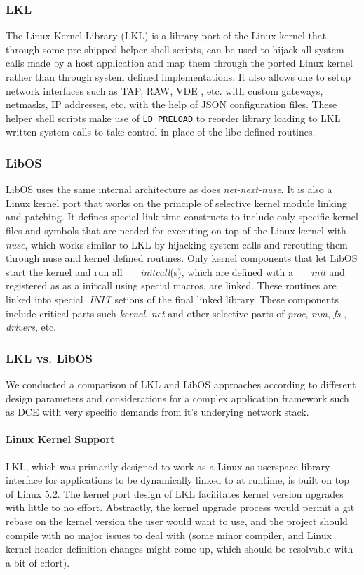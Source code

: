 \documentclass{sig-alternate}
\begin{document}
\subsubsection{LKL}
The Linux Kernel Library (LKL) is a library port of the Linux kernel that, through some pre-shipped helper shell scripts, can be used to hijack
all system calls made by a host application and map them through the ported Linux kernel rather than through system defined implementations. It also allows one 
to setup network interfaces such as TAP, RAW, VDE , etc. with custom gateways, netmasks, IP addresses, etc. with the help of JSON configuration files. These helper
shell scripts make use of \texttt{LD\_PRELOAD} to reorder library loading to LKL written system calls to take control in place of the libc defined routines.
 
\subsubsection{LibOS}
LibOS uses the same internal architecture as does \textit{net-next-nuse}.
It is also a Linux kernel port that works on the principle of selective 
kernel module linking and patching. It defines special link time constructs
to include only specific kernel files and 
symbols that are needed for executing on top of the Linux kernel with \textit{nuse}, which works similar to LKL by hijacking system calls 
and rerouting them through nuse and kernel defined routines. Only kernel components that let LibOS start the kernel and run all \textit{\_\_initcall}(s),
which are defined with a \textit{\_\_init} and registered as as a initcall using special macros, are linked. These routines are linked into special \textit{.INIT} 
setions of the final linked library. These components include critical parts such \textit{kernel}, \textit{net} and other selective parts of \textit{proc},
\textit{mm}, \textit{fs} , \textit{drivers}, etc. 

\subsubsection{LKL vs. LibOS}
We conducted a comparison of LKL and LibOS approaches according to different design parameters and considerations for a complex application framework such as
DCE with very specific demands from it's underying network stack.

\paragraph{Linux Kernel Support}
LKL, which was primarily designed to work as a Linux-as-userspace-library interface for applications to be dynamically linked to at runtime, is built on top of 
Linux 5.2. The kernel port design of LKL facilitates kernel version upgrades with little to no effort. Abstractly, the kernel upgrade process 
would permit a git rebase on the kernel version the user would want to use, and the project should compile with no major issues to deal with (some minor compiler, 
and Linux kernel header definition changes might come up, which should be resolvable with a bit of effort).
\end{document}
